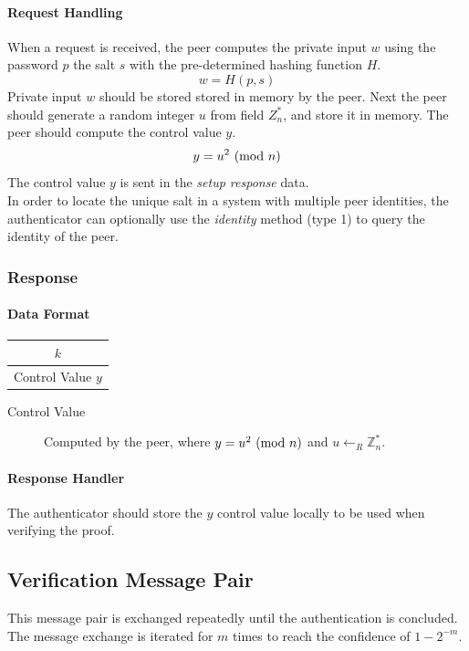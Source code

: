 \paragraph{Request Handling} When a request is received, the peer computes the private input $w$ using the password $p$ the salt $s$ with the pre-determined hashing function $H$.
$$w = H(p, s)$$
Private input $w$ should be stored stored in memory by the peer. 
Next the peer should generate a random integer $u$ from field $Z^*_n$, and store it in memory.
The peer should compute the control value $y$.
$$y = u^2 \ (\mathrm{mod}\ n)$$
The control value $y$ is sent in the \textit{setup response} data.
\bigskip
\\
In order to locate the unique salt in a system with multiple peer identities, the authenticator can optionally use the \textit{identity} method (type 1) to query the identity of the peer.


\subsubsection{Response}

\paragraph{Data Format}

\begin{center}
\begin{tabular}{|c|}
	\hline
	$k$ \\
	\hline
	Control Value $y$\\
	\hline
\end{tabular}
\end{center}

\bigskip

\begin{description}
	\item[Control Value] Computed by the peer, where $y = u^2 \ (\mathrm{mod}\ n)$ and $u \leftarrow_R \mathbb{Z}^*_n$.
\end{description}

\paragraph{Response Handler}
The authenticator should store the $y$ control value locally to be used when verifying the proof.

\subsection{Verification Message Pair}
This message pair is exchanged repeatedly until the authentication is concluded.
The message exchange is iterated for $m$ times to reach the confidence of $1 - 2^{-m}$.

